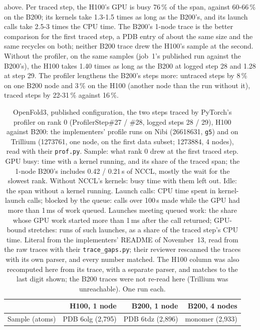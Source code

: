 above. Per traced step, the H100's GPU is busy 76\,\% of the span, against 60-66\,\% on the B200; its kernels take 1.3-1.5 times as long as the B200's, and its launch calls take 2.5-3 times the CPU time. The B200's 1-node trace is the better comparison for the first traced step, a PDB entry of about the same size and the same recycles on both; neither B200 trace drew the H100's sample at the second. Without the profiler, on the same samples (job~1's published run against the B200's), the H100 takes 1.40 times as long as the B200 at logged step 28 and 1.28 at step 29. The profiler lengthens the B200's steps more: untraced steps by 8\,\% on one B200 node and 3\,\% on the H100 (another node than the run without it), traced steps by 22-31\,\% against 16\,\%.

\begin{table}[ht]
  \caption{OpenFold3, published configuration, the two steps traced by PyTorch's profiler on rank 0 (ProfilerStep\#27 / \#28, logged steps 28 / 29), H100 against B200: the implementers' profile runs on Nibi (26618631, \texttt{g5}) and on Trillium (1273761, one node, on the first data subset; 1273884, 4 nodes), read with their \texttt{prof.py}. Sample: what rank 0 drew at the first traced step. GPU busy: time with a kernel running, and its share of the traced span; the 1-node B200's includes 0.42 / 0.21\,s of NCCL, mostly the wait for the slowest rank. Without NCCL's kernels: busy time with them left out. Idle: the span without a kernel running. Launch calls: CPU time spent in kernel-launch calls; blocked by the queue: calls over 100\,\textmu s made while the GPU had more than 1\,ms of work queued. Launches meeting queued work: the share whose GPU work started more than 1\,ms after the call returned; GPU-bound stretches: runs of such launches, as a share of the traced step's CPU time. Literal from the implementers' README of November~13, read from the raw traces with their \texttt{trace\_gaps.py}; their reviewer rescanned the traces with its own parser, and every number matched. The H100 column was also recomputed here from its trace, with a separate parser, and matches to the last digit shown; the B200 traces were not re-read here (Trillium was unreachable). One run each.}
  \label{tab:of3_h100_prof}
  \centering\small
  \begin{tabular}{lrrr}
    \toprule
     & H100, 1 node & B200, 1 node & B200, 4 nodes \\
    \midrule
    Sample (atoms) & PDB 6olg (2,795) & PDB 6tdz (2,896) & monomer (2,933) \\

\end{tabular}
\end{table}
